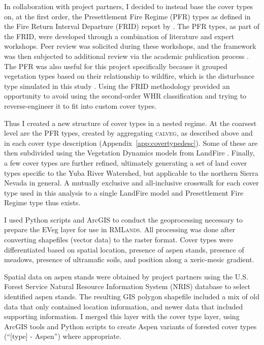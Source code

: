 In collaboration with project partners, I decided to instead base the cover types on, at the first order, the Presettlement Fire Regime (PFR) types as defined in the Fire Return Interval Departure (FRID) report by \citet{VandeWater2011}. The PFR types, as part of the FRID, were developed through a combination of literature and expert workshops. Peer review was solicited during these workshops, and the framework was then subjected to additional review via the academic publication process \citep{VandeWater2011}. The PFR was also useful for this project specifically because it grouped vegetation types based on their relationship to wildfire, which is the disturbance type simulated in this study \citep{VandeWater2011}. Using the FRID methodology provided an opportunity to avoid using the second-order WHR classification and trying to reverse-engineer it to fit into custom cover types. 

Thus I created a new structure of cover types in a nested regime. At the coarsest level are the PFR types, created by aggregating \textsc{calveg}, as described above and in each cover type description (Appendix~\ref{app:covertypedesc}). Some of these are then subdivided using the Vegetation Dynamics models from LandFire \citep{Landfire2007}. Finally, a few cover types are further refined, ultimately generating a set of land cover types specific to the Yuba River Watershed, but applicable to the northern Sierra Nevada in general. A mutually exclusive and all-inclusive crosswalk for each cover type used in this analysis to a single LandFire model and Presettlement Fire Regime type thus exists.

            
I used Python \citep{Python26} scripts and ArcGIS  to conduct the geoprocessing necessary to prepare the EVeg layer for use in \textsc{RMLands}. All processing was done after converting shapefiles (vector data) to the raster format. Cover types were differentiated based on spatial location, presence of aspen stands, presence of meadows, presence of ultramafic soils, and position along a xeric-mesic gradient. 

Spatial data on aspen stands were obtained by project partners using the U.S. Forest Service Natural Resource Information System (NRIS) database to select identified aspen stands. The resulting GIS polygon shapefile included a mix of old data that only contained location information, and newer data that included supporting information. I merged this layer with the cover type layer, using ArcGIS tools and Python scripts to create Aspen variants of forested cover types (``[type] - Aspen'') where appropriate.

